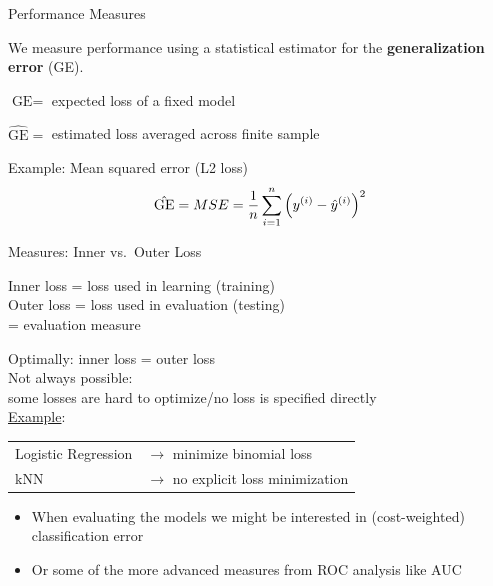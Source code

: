     \begin{frame}[c]{Performance Measures}

    We measure performance using a statistical estimator for the 
    \textbf{generalization error} (GE).

    $\text{GE} = $ expected loss of a fixed model

    $\hat{\text{GE}} = $ estimated loss averaged across finite sample

    Example: Mean squared error (L2 loss)
    \[
        \hat{\text{GE}} = MSE = \frac{1}{n} \sum_{i=1}^n \left(y^{(i)} - \hat{y}^{(i)}\right)^2
    \]

    \end{frame}

    \begin{frame}[c]{Measures: Inner vs.\ Outer Loss}

    \begin{center}
        Inner loss = loss used in learning (training)\\
        Outer loss = loss used in evaluation (testing)\\
            = evaluation measure
    \end{center}

    Optimally: inner loss = outer loss\\[.5em]
    Not always possible:\\ some losses are hard to optimize/no loss is specified directly\\

    \underline{Example}:\\[.5em]
    \begin{tabular}{ll}
    Logistic Regression & $\rightarrow$ minimize binomial loss \\
    kNN & $\rightarrow$ no explicit loss minimization\\
    \end{tabular}
    \begin{itemize}
      \item When evaluating the models we might be interested in (cost-weighted) classification error 
      \item Or some of the more advanced measures from ROC analysis like AUC
    \end{itemize}

    \end{frame}

